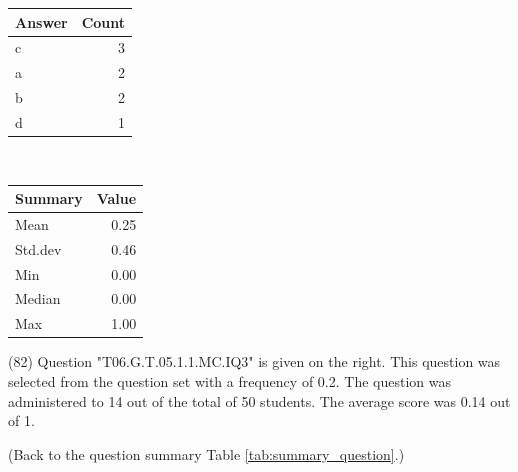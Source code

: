 \documentclass[12pt,english,nohyper]{tufte-handout}\usepackage[]{graphicx}\usepackage[]{color}
\begin{document}
\begin{center}%
\begin{tabular}{lr}
  \hline
Answer & Count \\ 
  \hline
c &   3 \\ 
  a &   2 \\ 
  b &   2 \\ 
  d &   1 \\ 
   \hline
\end{tabular}
~~~~~~~~%
\begin{tabular}{lr}
  \hline
Summary & Value \\ 
  \hline
Mean & 0.25 \\ 
  Std.dev & 0.46 \\ 
  Min & 0.00 \\ 
  Median & 0.00 \\ 
  Max & 1.00 \\ 
   \hline
\end{tabular}
\end{center}\newpage{} (82) Question "T06.G.T.05.1.1.MC.IQ3" is given on the right. This question was selected from the question set with a frequency of 0.2. The question was administered to 14 out of the total of 50 students. The average score was 0.14 out of 1.

 (Back to the question summary Table \ref{tab:summary_question}.)
\end{document}
